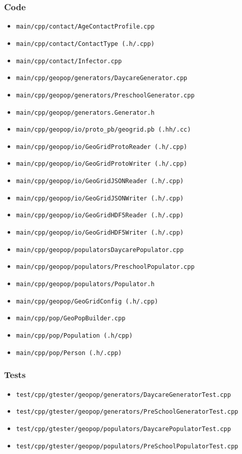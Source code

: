 \documentclass[runningheads]{llncs}
\begin{document}
	\subsubsection{Code}
	\begin{itemize}
		\item \texttt{main/cpp/contact/AgeContactProfile.cpp}
		\item \texttt{main/cpp/contact/ContactType (.h/.cpp)}
		\item \texttt{main/cpp/contact/Infector.cpp}
		\item \texttt{main/cpp/geopop/generators/DaycareGenerator.cpp}
		\item \texttt{main/cpp/geopop/generators/PreschoolGenerator.cpp}
		\item \texttt{main/cpp/geopop/generators.Generator.h}
		\item \texttt{main/cpp/geopop/io/proto\_pb/geogrid.pb (.hh/.cc)}
		\item \texttt{main/cpp/geopop/io/GeoGridProtoReader (.h/.cpp)}
		\item \texttt{main/cpp/geopop/io/GeoGridProtoWriter (.h/.cpp)}
		\item \texttt{main/cpp/geopop/io/GeoGridJSONReader (.h/.cpp)}
		\item \texttt{main/cpp/geopop/io/GeoGridJSONWriter (.h/.cpp)}
		\item \texttt{main/cpp/geopop/io/GeoGridHDF5Reader (.h/.cpp)}
		\item \texttt{main/cpp/geopop/io/GeoGridHDF5Writer (.h/.cpp)}
		\item \texttt{main/cpp/geopop/populatorsDaycarePopulator.cpp}
		\item \texttt{main/cpp/geopop/populators/PreschoolPopulator.cpp}
		\item \texttt{main/cpp/geopop/populators/Populator.h}
		\item \texttt{main/cpp/geopop/GeoGridConfig (.h/.cpp)}
		\item \texttt{main/cpp/pop/GeoPopBuilder.cpp}
		\item \texttt{main/cpp/pop/Population (.h/cpp)}
		\item \texttt{main/cpp/pop/Person (.h/.cpp)}
	\end{itemize}
	\subsubsection{Tests}
	\begin{itemize}
		\item \texttt{test/cpp/gtester/geopop/generators/DaycareGeneratorTest.cpp}
		\item \texttt{test/cpp/gtester/geopop/generators/PreSchoolGeneratorTest.cpp}
		\item \texttt{test/cpp/gtester/geopop/populators/DaycarePopulatorTest.cpp}
		\item \texttt{test/cpp/gtester/geopop/populators/PreSchoolPopulatorTest.cpp}	
	\end{itemize}
	
\end{document}
